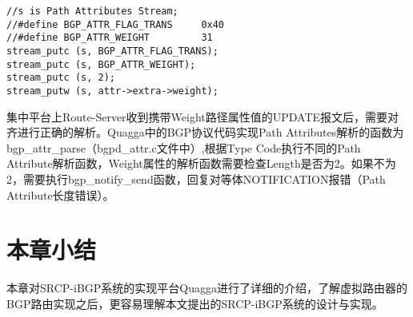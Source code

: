 \lstset{language=C}
\begin{lstlisting}
//s is Path Attributes Stream;
//#define BGP_ATTR_FLAG_TRANS     0x40
//#define BGP_ATTR_WEIGHT         31
stream_putc (s, BGP_ATTR_FLAG_TRANS);
stream_putc (s, BGP_ATTR_WEIGHT);
stream_putc (s, 2);
stream_putw (s, attr->extra->weight);
\end{lstlisting}


集中平台上Route-Server收到携带Weight路径属性值的UPDATE报文后，需要对齐进行正确的解析。Quagga中的BGP协议代码实现Path Attributes解析的函数为bgp\_attr\_parse（bgpd\_attr.c文件中）,根据Type Code执行不同的Path Attribute解析函数，Weight属性的解析函数需要检查Length是否为2。如果不为2，需要执行bgp\_notify\_send函数，回复对等体NOTIFICATION报错（Path Attribute长度错误）。



\section{本章小结}
本章对SRCP-iBGP系统的实现平台Quagga进行了详细的介绍，了解虚拟路由器的BGP路由实现之后，更容易理解本文提出的SRCP-iBGP系统的设计与实现。
